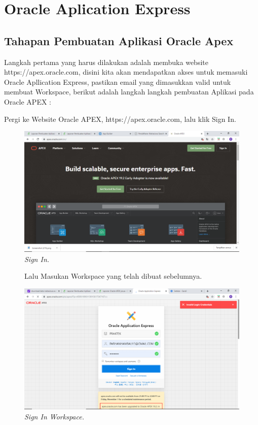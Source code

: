 \chapter{Oracle Aplication Express}

\section{Tahapan Pembuatan Aplikasi Oracle Apex}
Langkah pertama yang harus dilakukan adalah membuka website https://apex.oracle.com, disini kita akan mendapatkan akses untuk memasuki Oracle Apllication Express, pastikan email yang dimasukkan valid untuk membuat Workspace, berikut adalah langkah langkah pembuatan Aplikasi pada Oracle APEX :

\begin{enumerate}
\item[1]Pergi ke Website Oracle APEX, https://apex.oracle.com, lalu klik Sign In.

\begin{figure}[!htbp]
    \begin{center}
    \includegraphics[scale=0.2]{figures/14.png}
    \caption{\textit{Sign In.}}
    \end{center}   
    \end{figure}
    
\begin{figure}[!htbp]
\item[2]Lalu Masukan Workspace yang telah dibuat sebelumnya.

    \begin{center}
    \includegraphics[scale=0.2]{figures/1.png}
    \caption{\textit{Sign In Workspace.}}
    \end{center}



\end{figure}
\end{enumerate}

